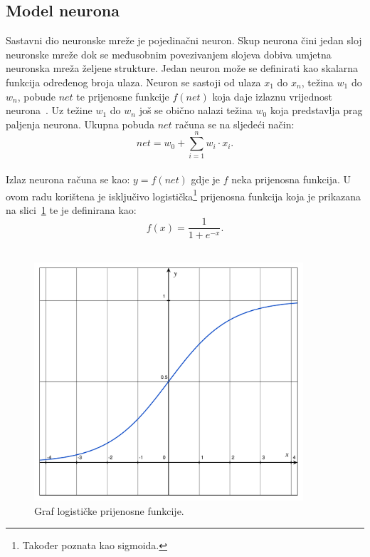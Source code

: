 \subsection{Model neurona}
\label{subsec:model-neurona}
Sastavni dio neuronske mreže je pojedinačni neuron. Skup neurona čini jedan sloj neuronske mreže dok se međusobnim
povezivanjem slojeva dobiva umjetna neuronska mreža željene strukture. Jedan neuron može se definirati kao skalarna
funkcija određenog broja ulaza. Neuron se sastoji od ulaza $x_1$ do $x_n$, težina $w_1$ do $w_n$, pobude $net$ te
prijenosne funkcije $f(net)$ koja daje izlaznu vrijednost neurona\ \citep{cupic2013}. Uz težine $w_1$ do $w_n$ još se
obično nalazi težina $w_0$ koja predstavlja prag paljenja neurona. Ukupna pobuda $net$ računa se na sljedeći način:\\
\begin{equation}
    net = w_0 + \sum_{i = 1}^{n} w_i \cdot x_i.\label{eq:neuron-net}
\end{equation}
\\
Izlaz neurona računa se kao: $y = f(net)$ gdje je $f$ neka prijenosna funkcija. U ovom radu korištena je isključivo
logistička\footnote{Također poznata kao sigmoida.} prijenosna funkcija koja je prikazana na
slici\ \ref{fig:logistic-function} te je definirana kao:\\
\begin{equation}
    f(x) = \frac{1}{1 + e^{-x}}.\label{eq:logistic-function}
\end{equation}
\\
\begin{figure}[!htb]
    \centering
    \includegraphics[width=10cm]{images/chapter3/logistic-function.pdf}
    \caption{Graf logističke prijenosne funkcije.}
    \label{fig:logistic-function}
\end{figure}
